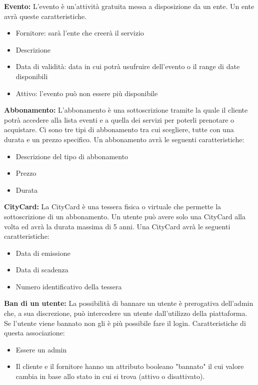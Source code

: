 \textbf{Evento:} L'evento è un'attività gratuita messa a disposizione da un ente.
Un ente avrà queste caratteristiche.
\begin{itemize}
    \item Fornitore: sarà l'ente che creerà il servizio
    \item Descrizione
    \item Data di validità: data in cui potrà usufruire dell'evento o il range di date disponibili
    \item Attivo: l'evento può non essere più disponibile
\end{itemize}

\textbf{Abbonamento:} L'abbonamento è una sottoscrizione tramite la quale il cliente potrà accedere alla lista eventi e a quella dei servizi per poterli prenotare o acquistare. Ci sono tre tipi di abbonamento tra cui scegliere, tutte con una durata e un prezzo specifico.
Un abbonamento avrà le seguenti caratteristiche:
\begin{itemize}
    \item Descrizione del tipo di abbonamento
    \item Prezzo
    \item Durata
\end{itemize}

\textbf{CityCard:} La CityCard è una tessera fisica o virtuale che permette la sottoscrizione di un abbonamento.
Un utente può avere solo una CityCard alla volta ed avrà la durata massima di 5 anni.
Una CityCard avrà le seguenti caratteristiche:
\begin{itemize}
    \item Data di emissione
    \item Data di scadenza
    \item Numero identificativo della tessera
\end{itemize}

\textbf{Ban di un utente:} La possibilità di bannare un utente è prerogativa dell'admin che, a sua discrezione, può intercedere un utente dall'utilizzo della piattaforma. Se l'utente viene bannato non gli è più possibile fare il login.
Caratteristiche di questa associazione:
\begin{itemize}
    \item Essere un admin
    \item Il cliente e il fornitore hanno un attributo booleano "bannato" il cui valore cambia in base allo stato in cui si trova (attivo o disattivato).
\end{itemize}

